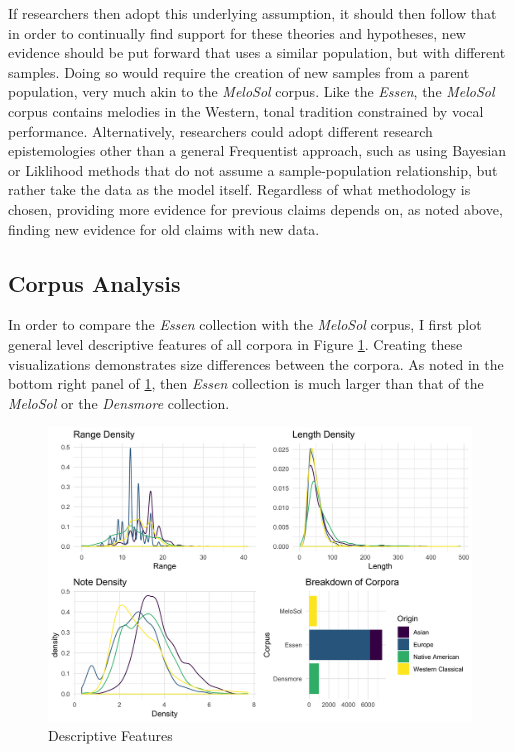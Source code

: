 \documentclass[12pt,]{book}
\begin{document}
If researchers then adopt this underlying assumption, it should then follow that in order to continually find support for these theories and hypotheses, new evidence should be put forward that uses a similar population, but with different samples.
Doing so would require the creation of new samples from a parent population, very much akin to the \emph{MeloSol} corpus.
Like the \emph{Essen}, the \emph{MeloSol} corpus contains melodies in the Western, tonal tradition constrained by vocal performance.
Alternatively, researchers could adopt different research epistemologies other than a general Frequentist approach, such as using Bayesian or Liklihood methods that do not assume a sample-population relationship, but rather take the data as the model itself.
Regardless of what methodology is chosen, providing more evidence for previous claims depends on, as noted above, finding new evidence for old claims with new data.

\hypertarget{corpus-analysis-1}{%
\subsection{Corpus Analysis}\label{corpus-analysis-1}}

In order to compare the \emph{Essen} collection with the \emph{MeloSol} corpus, I first plot general level descriptive features of all corpora in Figure \ref{fig:compdesc}.
Creating these visualizations demonstrates size differences between the corpora.
As noted in the bottom right panel of \ref{fig:compdesc}, then \emph{Essen} collection is much larger than that of the \emph{MeloSol} or the \emph{Densmore} collection.

\begin{figure}

{\centering \includegraphics[width=1\linewidth]{img/comparative_descritivepanel} 

}

\caption{Descriptive Features}\label{fig:compdesc}
\end{figure}
\end{document}
